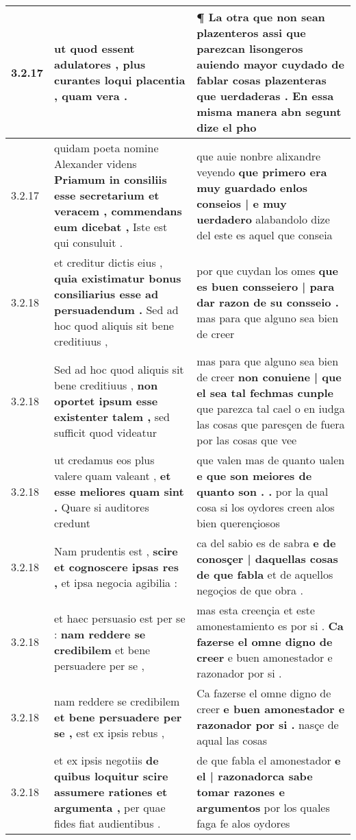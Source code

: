 \begin{tabular}{|p{1cm}|p{6.5cm}|p{6.5cm}|}
3.2.17 & ut quod essent adulatores , \textbf{ plus curantes loqui placentia , } quam vera . & ¶ La otra que non sean plazenteros \textbf{ assi que parezcan lisongeros auiendo mayor cuydado de fablar cosas plazenteras que uerdaderas . } En essa misma manera abn segunt dize el pho \\\hline
3.2.17 & quidam poeta nomine Alexander videns \textbf{ Priamum in consiliis esse secretarium et veracem , commendans eum dicebat , } Iste est qui consuluit . & que auie nonbre alixandre veyendo \textbf{ que primero era muy guardado enlos conseios | e muy uerdadero } alabandolo dize del este es aquel que conseia \\\hline
3.2.18 & et creditur dictis eius , \textbf{ quia existimatur bonus consiliarius esse ad persuadendum . } Sed ad hoc quod aliquis sit bene creditiuus , & por que cuydan los omes \textbf{ que es buen consseiero | para dar razon de su consseio . } mas para que alguno sea bien de creer \\\hline
3.2.18 & Sed ad hoc quod aliquis sit bene creditiuus , \textbf{ non oportet ipsum esse existenter talem , } sed sufficit quod videatur & mas para que alguno sea bien de creer \textbf{ non conuiene | que el sea tal fechmas cunple } que parezca tal cael o en iudga las cosas que paresçen de fuera por las cosas que vee \\\hline
3.2.18 & ut credamus eos plus valere quam valeant , \textbf{ et esse meliores quam sint . } Quare si auditores credunt & que valen mas de quanto ualen \textbf{ e que son meiores de quanto son . . } por la qual cosa si los oydores creen alos bien querençiosos \\\hline
3.2.18 & Nam prudentis est , \textbf{ scire et cognoscere ipsas res , } et ipsa negocia agibilia : & ca del sabio es de sabra \textbf{ e de conosçer | daquellas cosas de que fabla } et de aquellos negoçios de que obra . \\\hline
3.2.18 & et haec persuasio est per se : \textbf{ nam reddere se credibilem } et bene persuadere per se , & mas esta creençia et este amonestamiento es por si . \textbf{ Ca fazerse el omne digno de creer } e buen amonestador e razonador por si . \\\hline
3.2.18 & nam reddere se credibilem \textbf{ et bene persuadere per se , } est ex ipsis rebus , & Ca fazerse el omne digno de creer \textbf{ e buen amonestador e razonador por si . } nasçe de aqual las cosas \\\hline
3.2.18 & et ex ipsis negotiis \textbf{ de quibus loquitur scire assumere rationes et argumenta , } per quae fides fiat audientibus . & de que fabla el amonestador \textbf{ e el | razonadorca sabe tomar razones e argumentos } por los quales faga fe alos oydores \\\hline

\end{tabular}
